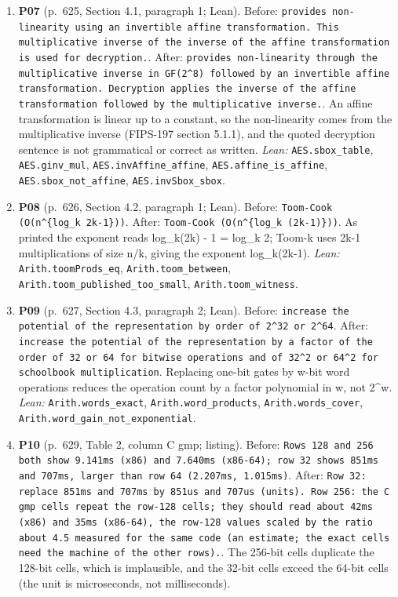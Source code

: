\documentclass[9pt,twocolumn]{article}
\begin{document}
\begin{enumerate}[label=]
\item \textbf{P07} (p.~625, Section 4.1, paragraph 1; Lean). Before: \texttt{provides non-linearity using an invertible affine transformation. This multiplicative inverse of the inverse of the affine transformation is used for decryption.}. After: \texttt{provides non-linearity through the multiplicative inverse in GF(2\^{}8) followed by an invertible affine transformation. Decryption applies the inverse of the affine transformation followed by the multiplicative inverse.}. An affine transformation is linear up to a constant, so the non-linearity comes from the multiplicative inverse (FIPS-197 section 5.1.1), and the quoted decryption sentence is not grammatical or correct as written. \emph{Lean:} \texttt{AES.sbox\_table}, \texttt{AES.ginv\_mul}, \texttt{AES.invAffine\_affine}, \texttt{AES.affine\_is\_affine}, \texttt{AES.sbox\_not\_affine}, \texttt{AES.invSbox\_sbox}. 
\item \textbf{P08} (p.~626, Section 4.2, paragraph 1; Lean). Before: \texttt{Toom-Cook (O(n\^{}\{log\_k 2k-1\}))}. After: \texttt{Toom-Cook (O(n\^{}\{log\_k (2k-1)\}))}. As printed the exponent reads log\_k(2k) - 1 = log\_k 2; Toom-k uses 2k-1 multiplications of size n/k, giving the exponent log\_k(2k-1). \emph{Lean:} \texttt{Arith.toomProds\_eq}, \texttt{Arith.toom\_between}, \texttt{Arith.toom\_published\_too\_small}, \texttt{Arith.toom\_witness}. 
\item \textbf{P09} (p.~627, Section 4.3, paragraph 2; Lean). Before: \texttt{increase the potential of the representation by order of 2\^{}32 or 2\^{}64}. After: \texttt{increase the potential of the representation by a factor of the order of 32 or 64 for bitwise operations and of 32\^{}2 or 64\^{}2 for schoolbook multiplication}. Replacing one-bit gates by w-bit word operations reduces the operation count by a factor polynomial in w, not 2\^{}w. \emph{Lean:} \texttt{Arith.words\_exact}, \texttt{Arith.word\_products}, \texttt{Arith.words\_cover}, \texttt{Arith.word\_gain\_not\_exponential}. 
\item \textbf{P10} (p.~629, Table 2, column C gmp; listing). Before: \texttt{Rows 128 and 256 both show 9.141ms (x86) and 7.640ms (x86-64); row 32 shows 851ms and 707ms, larger than row 64 (2.207ms, 1.015ms)}. After: \texttt{Row 32: replace 851ms and 707ms by 851us and 707us (units). Row 256: the C gmp cells repeat the row-128 cells; they should read about 42ms (x86) and 35ms (x86-64), the row-128 values scaled by the ratio about 4.5 measured for the same code (an estimate; the exact cells need the machine of the other rows).}. The 256-bit cells duplicate the 128-bit cells, which is implausible, and the 32-bit cells exceed the 64-bit cells (the unit is microseconds, not milliseconds). 

\end{enumerate}
\end{document}
